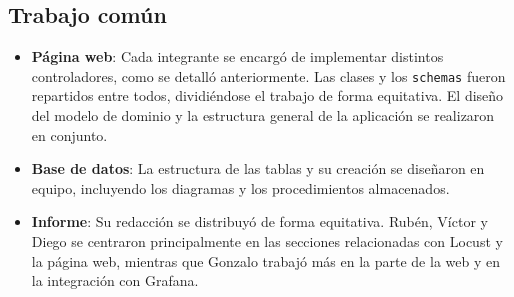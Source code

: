 \documentclass[10pt]{book}
\begin{document}
\subsection{Trabajo común}
\begin{itemize}
    \item \textbf{Página web}: Cada integrante se encargó de implementar distintos controladores, como se detalló anteriormente. Las clases y los \texttt{schemas} fueron repartidos entre todos, dividiéndose el trabajo de forma equitativa. El diseño del modelo de dominio y la estructura general de la aplicación se realizaron en conjunto.
    \item \textbf{Base de datos}: La estructura de las tablas y su creación se diseñaron en equipo, incluyendo los diagramas y los procedimientos almacenados.
    \item \textbf{Informe}: Su redacción se distribuyó de forma equitativa. Rubén, Víctor y Diego se centraron principalmente en las secciones relacionadas con Locust y la página web, mientras que Gonzalo trabajó más en la parte de la web y en la integración con Grafana.
\end{itemize}

\printbibliography
\end{document}
